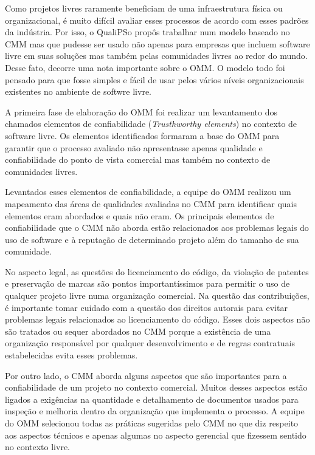 Como projetos livres raramente beneficiam de uma infraestrutura física
ou organizacional, é muito difícil avaliar esses processos de acordo
com esses padrões da indústria. Por isso, o QualiPSo propôs trabalhar
num modelo baseado no CMM mas que pudesse ser usado não apenas para
empresas que incluem software livre em suas soluções mas também pelas
comunidades livres ao redor do mundo. Desse fato, decorre uma nota
importante sobre o OMM. O modelo todo foi pensado para que fosse
simples e fácil de usar pelos vários níveis organizacionais existentes
no ambiente de softwre livre.

A primeira fase de elaboração do OMM foi realizar um levantamento dos
chamados elementos de confiabilidade (\textit{Trusthworthy elements})
no contexto de software livre. Os elementos identificados formaram a
base do OMM para garantir que o processo avaliado não apresentasse
apenas qualidade e confiabilidade do ponto de vista comercial mas
também no contexto de comunidades livres.

Levantados esses elementos de confiabilidade, a equipe do OMM realizou
um mapeamento das áreas de qualidades avaliadas no CMM para
identificar quais elementos eram abordados e quais não eram. Os
principais elementos de confiabilidade que o CMM não aborda estão
relacionados aos problemas legais do uso de software e à reputação de
determinado projeto além do tamanho de sua comunidade.

No aspecto legal, as questões do licenciamento do código, da violação
de patentes e preservação de marcas são pontos importantíssimos para
permitir o uso de qualquer projeto livre numa organização
comercial. Na questão das contribuições, é importante tomar cuidado
com a questão dos direitos autorais para evitar problemas legais
relacionados ao licenciamento do código.  Esses dois aspectos não são
tratados ou sequer abordados no CMM porque a existência de uma
organização responsável por qualquer desenvolvimento e de regras
contratuais estabelecidas evita esses problemas.

Por outro lado, o CMM aborda alguns aspectos que são importantes para
a confiabilidade de um projeto no contexto comercial. Muitos desses
aspectos estão ligados a exigências na quantidade e detalhamento de
documentos usados para inspeção e melhoria dentro da organização que
implementa o processo. A equipe do OMM selecionou todas as práticas
sugeridas pelo CMM no que diz respeito aos aspectos técnicos e apenas
algumas no aspecto gerencial que fizessem sentido no contexto livre.

